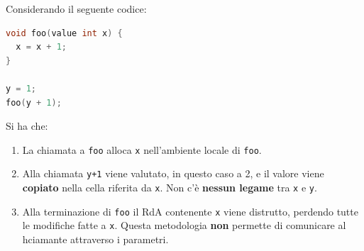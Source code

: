 \documentclass[a4paper]{article}
\begin{document}
\vspace{1em}
\noindent
Considerando il seguente codice:
\begin{lstlisting}[language=C]
void foo(value int x) {
  x = x + 1;
}

y = 1;
foo(y + 1);
\end{lstlisting}
Si ha che:
\begin{enumerate}
  \item La chiamata a \texttt{foo} alloca \texttt{x} nell'ambiente locale di \texttt{foo}.

  \item Alla chiamata \texttt{y+1} viene valutato, in questo caso a 2, e il valore
    viene \textbf{copiato} nella cella riferita da \texttt{x}. Non c'è \textbf{nessun
    legame} tra \texttt{x} e \texttt{y}.
    
  \item Alla terminazione di \texttt{foo} il RdA contenente \texttt{x} viene distrutto,
    perdendo tutte le modifiche fatte a \texttt{x}. Questa metodologia \textbf{non} 
    permette di comunicare al hciamante attraverso i parametri.
\end{enumerate}
\end{document}

